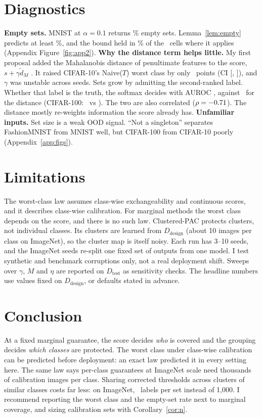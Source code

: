 \documentclass{article}
\newcommand{\dtest}{D_\text{test}}
\newcommand{\ddes}{D_\text{design}}
\begin{document}
\section{Diagnostics}\label{sec:diag}
\textbf{Empty sets.} MNIST at $\alpha=0.1$ returns \EmptyMNISTNaive\% empty sets. Lemma~\ref{lem:empty} predicts at least
\EmptyBoundMnist\%, and the bound held in \EmptyHolds\% of the \EmptyN\ cells where it applies (Appendix Figure~\ref{fig:app2}).
\textbf{Why the distance term helps little.} My first proposal added the Mahalanobis distance of penultimate features to the score,
$s+\gamma\tilde d_M$ \citep{lee2018simple}. It raised CIFAR-10's Naive($T$) worst class by only \BsCTenDistVsNaiveW\ points (CI
[\BsCTenDistVsNaiveWLo, \BsCTenDistVsNaiveWHi]), and $\gamma$ was unstable across seeds. Sets grow by admitting the second-ranked
label. Whether that label is the truth, the softmax decides with AUROC \DdSoftCTen, against \DdDistCTen\ for the distance (CIFAR-100:
\DdSoftCHun\ vs \DdDistCHun). The two are also correlated ($\rho=-0.71$). The distance mostly re-weights information the score
already has.
\textbf{Unfamiliar inputs.} Set size is a weak OOD signal. ``Not a singleton'' separates FashionMNIST from MNIST well, but CIFAR-100
from CIFAR-10 poorly (Appendix~\ref{app:figs}).

\section{Limitations}
The worst-class law assumes class-wise exchangeability and continuous scores, and it describes class-wise calibration. For marginal
methods the worst class depends on the score, and there is no such law. Clustered-PAC protects clusters, not individual classes. Its
clusters are learned from $\ddes$ (about 10 images per class on ImageNet), so the cluster map is itself noisy. Each run has 3--10
seeds, and the ImageNet seeds re-split one fixed set of outputs from one model. I test synthetic and benchmark corruptions only, not a
real deployment shift. Sweeps over $\gamma$, $M$ and $\eta$ are reported on $\dtest$ as sensitivity checks. The headline numbers use
values fixed on $\ddes$, or defaults stated in advance.

\section{Conclusion}
At a fixed marginal guarantee, the score decides \emph{who} is covered and the grouping decides \emph{which classes} are protected. The
worst class under class-wise calibration can be predicted before deployment: an exact law predicted it in every setting here. The same
law says per-class guarantees at ImageNet scale need thousands of calibration images per class. Sharing corrected thresholds across
clusters of similar classes costs far less: on ImageNet, \SizeINetClusPAC\ labels per set instead of 1{,}000. I recommend reporting
the worst class and the empty-set rate next to marginal coverage, and sizing calibration sets with Corollary~\ref{cor:n}.
\end{document}
